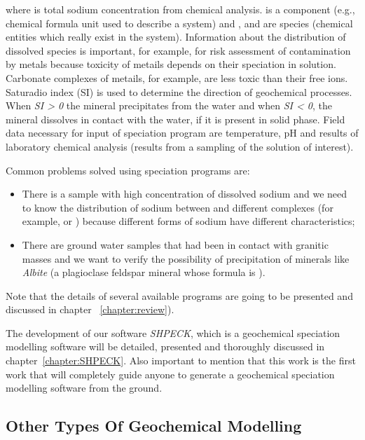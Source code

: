 \documentclass[ppgc,mestrado,english]{iiufrgs}
\begin{document}
where  is total sodium concentration from chemical analysis.  is a component (e.g., chemical formula unit used to describe a system) and ,  and  are species (chemical entities which really exist in the system). Information about the distribution of dissolved species is important, for example, for risk assessment of contamination by metals because toxicity of metails depends on their speciation in solution. Carbonate complexes of metails, for example, are less toxic than their free ions.
Saturadio index (SI) is used to determine the direction of geochemical processes. When \emph{SI > 0} the mineral precipitates from the water and when \emph{SI < 0}, the mineral dissolves in contact with the water, if it is present in solid phase. Field data necessary for input of speciation program are temperature, pH and results of laboratory chemical analysis (results from a sampling of the solution of interest).

Common problems solved using speciation programs are: 
\begin{itemize}
\item There is a sample with high concentration of dissolved sodium and we need to know the distribution of sodium between  and different complexes (for example,  or ) because different forms of sodium have different characteristics;
\item There are ground water samples that had been in contact with granitic masses and we want to verify the possibility of precipitation of minerals like \emph{Albite} (a plagioclase feldspar mineral whose formula is \emph{}).
\end{itemize}
Note that the details of several available programs are going to be presented and discussed in chapter ~\ref{chapter:review}).

The development of our software \emph{SHPECK}, which is a geochemical speciation modelling software will be detailed, presented and thoroughly discussed in chapter~\ref{chapter:SHPECK}. Also important to mention that this work is the first work that will completely guide anyone to generate a geochemical speciation modelling software from the ground.

\subsection{Other Types Of Geochemical Modelling}
\end{document}
